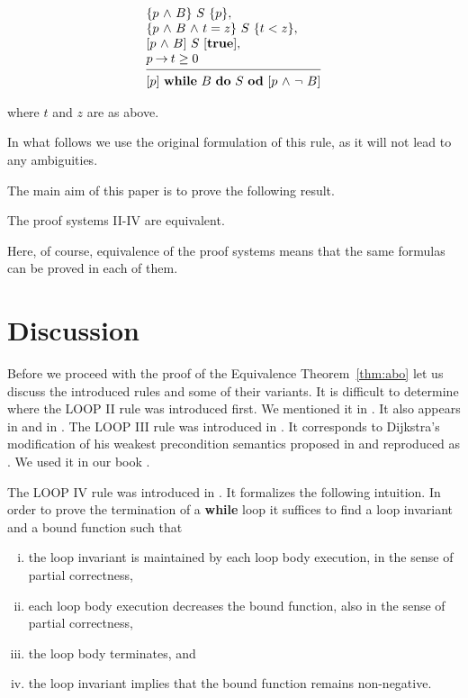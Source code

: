 \documentclass[manuscript, screen, review]{acmart}
\begin{document}
\[
 \begin{array}{l}
  \HT{p \A B}{S}{p},                      \\
  \HT{p \A B \A t=z}{S}{t<z},             \\
  \HTT{p \A B}{S}{\mathbf{true}},         \\
  p \ra t \geq 0                         \\
  [-\medskipamount]
  \hrulefill                              \\
  \HTT{p}{\WDD{B}{S}}{p \A \neg\ B}
 \end{array}
\]

\NI
where $t$ and $z$ are as above.
\III

In what follows we use the original formulation of this rule, 
as it will not lead to any ambiguities.


The main aim of this paper is to prove the following result.

\begin{theorem}[Equivalence] \label{thm:abo}
The proof systems II-IV are equivalent.  
\end{theorem}

Here, of course, equivalence of the proof systems means that the same
formulas can be proved in each of them.



\section{Discussion}
\label{sec:discussion}

Before we proceed with the proof of the Equivalence Theorem~\ref{thm:abo} let us
discuss the introduced rules and some of their variants.  It is
difficult to determine where the LOOP II rule was introduced first. We
mentioned it in \cite{ABO90}. It also appears in \cite[page 64]{Rey98}
and in \cite[page 151]{Almeida11}.  The LOOP III rule was introduced
in \cite{OG76a}.  It corresponds to Dijkstra's modification of his
weakest precondition semantics proposed in \cite{EWD:EWD573} and
reproduced as %
\cite{EWD:EWD573pub}.  We used it in our book \cite{ABO09}.

The LOOP IV rule was introduced in \cite{ABO25}.
It formalizes the following intuition. In order to prove the
termination of a \textbf{while} loop it suffices to find a loop
invariant and a bound function such that

\begin{enumerate}[(i)]
 \item the loop invariant is maintained by each loop body execution, 
       in the sense of partial correctness,
 \item each loop body execution decreases the bound function, 
       also in the sense of partial correctness,
 \item the loop body terminates, and
 \item the loop invariant implies that the bound function remains non-negative.
\end{enumerate}
\end{document}
